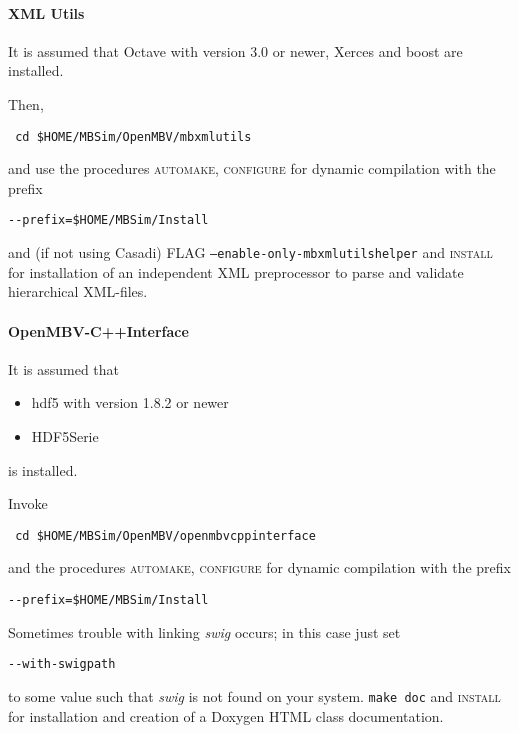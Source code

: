 \paragraph{XML Utils}
It is assumed that Octave with version 3.0 or newer, Xerces and boost are installed.\par
Then,
\begin{verbatim}
 cd $HOME/MBSim/OpenMBV/mbxmlutils
\end{verbatim} 
and use the procedures \textsc{automake}, \textsc{configure} for dynamic compilation with the prefix
\begin{verbatim}
--prefix=$HOME/MBSim/Install
\end{verbatim}
and (if not using Casadi) FLAG \texttt{--enable-only-mbxmlutilshelper} and \textsc{install} for installation of an independent XML preprocessor to parse and validate hierarchical XML-files.

\paragraph{OpenMBV-C++Interface}
It is assumed that 
\begin{itemize}
\item hdf5 with version 1.8.2 or newer
\item HDF5Serie 
\end{itemize}
is installed.\par
Invoke
\begin{verbatim}
 cd $HOME/MBSim/OpenMBV/openmbvcppinterface
\end{verbatim} 
and the procedures \textsc{automake, configure} for dynamic compilation with the prefix
\begin{verbatim}
--prefix=$HOME/MBSim/Install
\end{verbatim}
Sometimes trouble with linking \emph{swig} occurs; in this case just set
\begin{verbatim}
--with-swigpath
\end{verbatim}
to some value such that \emph{swig} is not found on your system.
\texttt{make doc} and \textsc{install} for installation and creation of a Doxygen HTML class documentation. 

